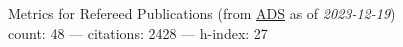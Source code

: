 Metrics for Refereed Publications (from \href{\adsurl}{ADS} as of \textit{2023-12-19}) \\count: 48 --- citations: 2428 --- h-index: 27